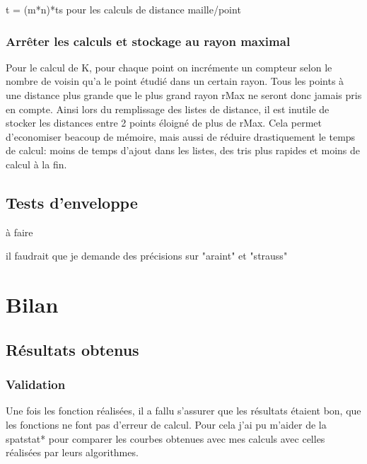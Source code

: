 \documentclass[stage2a]{tnreport}
\begin{document}
\hspace*{1cm} t = (m*n)*ts \hspace*{1cm} pour les calculs de distance maille/point\\

\subsection{Arrêter les calculs et stockage au rayon maximal}
Pour le calcul de K, pour chaque point on incrémente un compteur selon le nombre de voisin qu'a le point étudié dans un certain rayon. Tous les points à une distance plus grande que le plus grand rayon rMax ne seront donc jamais pris en compte. Ainsi lors du remplissage des listes de distance, il est inutile de stocker les distances entre 2 points éloigné de plus de rMax. Cela permet d'economiser beacoup de mémoire, mais aussi de réduire drastiquement le temps de calcul:  moins de temps d'ajout dans les listes, des tris plus rapides et moins de calcul à la fin.

\section{Tests d'enveloppe}

à faire

il faudrait que je demande des précisions sur "araint" et "strauss"

\newpage


\chapter{Bilan}

\section{Résultats obtenus}

\subsection{Validation}

Une fois les fonction réalisées, il a fallu s'assurer que les résultats étaient bon, que les fonctions ne font pas d'erreur de calcul. Pour cela j'ai pu m'aider de la \gls{spatstat}* pour comparer les courbes obtenues avec mes calculs avec celles réalisées par leurs algorithmes.
\end{document}
